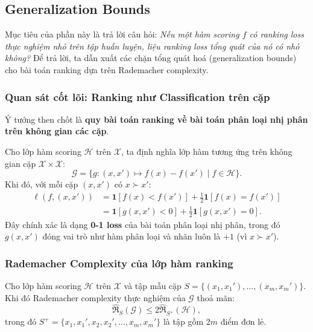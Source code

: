 \subsection{Generalization Bounds}
\label{sec:genbounds}

Mục tiêu của phần này là trả lời câu hỏi: \textit{Nếu một hàm 
scoring $f$ có ranking loss thực nghiệm nhỏ trên tập huấn luyện, 
liệu ranking loss tổng quát của nó có nhỏ không?} Để trả lời, 
ta dẫn xuất các chặn tổng quát hoá (generalization bounds) cho 
bài toán ranking dựa trên Rademacher complexity.

\subsubsection{Quan sát cốt lõi: Ranking như Classification trên cặp}

Ý tưởng then chốt là \textbf{quy bài toán ranking về bài toán 
phân loại nhị phân trên không gian các cặp}. 

Cho lớp hàm scoring $\mathcal{H}$ trên $\mathcal{X}$, ta định 
nghĩa lớp hàm tương ứng trên không gian cặp 
$\mathcal{X} \times \mathcal{X}$:
\[
  \mathcal{G} = \{ g : (x, x') \mapsto f(x) - f(x') \mid f \in \mathcal{H} \}.
\]
Khi đó, với mỗi cặp $(x, x')$ có $x \succ x'$:
\begin{align*}
  \ell(f, (x,x')) &= \mathbf{1}[f(x) < f(x')] + \tfrac{1}{2}\mathbf{1}[f(x) = f(x')] \\
                  &= \mathbf{1}[g(x,x') < 0] + \tfrac{1}{2}\mathbf{1}[g(x,x') = 0].
\end{align*}
Đây chính xác là dạng \textbf{0-1 loss} của bài toán phân loại 
nhị phân, trong đó $g(x,x')$ đóng vai trò như hàm phân loại 
và nhãn luôn là $+1$ (vì $x \succ x'$).

\subsubsection{Rademacher Complexity của lớp hàm ranking}

\begin{lemma}
\label{lem:rademacher_ranking}
Cho lớp hàm scoring $\mathcal{H}$ trên $\mathcal{X}$ và tập mẫu 
cặp $S = \{(x_1, x_1'), \ldots, (x_m, x_m')\}$. Khi đó Rademacher 
complexity thực nghiệm của $\mathcal{G}$ thoả mãn:
\[
  \hat{\mathfrak{R}}_S(\mathcal{G}) \leq 2\hat{\mathfrak{R}}_{S^+}(\mathcal{H}),
\]
trong đó $S^+ = \{x_1, x_1', x_2, x_2', \ldots, x_m, x_m'\}$ là 
tập gồm $2m$ điểm đơn lẻ.
\end{lemma}

